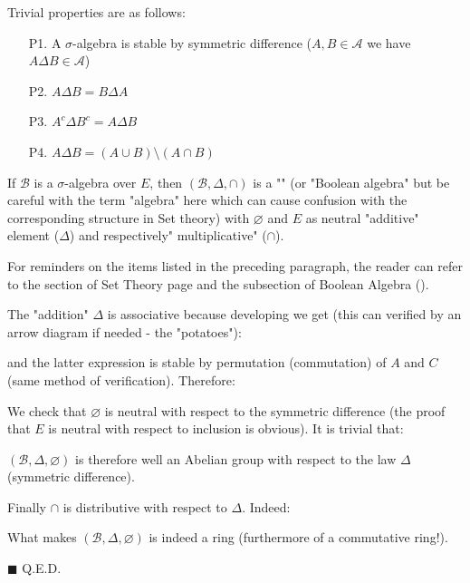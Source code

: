 	Trivial properties are as follows:
	\begin{enumerate}
		\item[P1.] A $\sigma$-algebra is stable by symmetric difference ($A,B\in \mathcal{A}$ we have $A\Delta B\in \mathcal{A}$)
		
		\item[P2.] $A\Delta B=B\Delta A$
		\item[P3.] $A^c\Delta B^c=A\Delta B$
			
		\item[P4.] $A\Delta B=(A\cup B)\setminus (A\cap B)$
	\end{enumerate}
	\begin{theorem}
	If $\mathcal{B}$ is a $\sigma$-algebra over $E$, then $(\mathcal{B},\Delta,\cap)$ is a "" (or "Boolean algebra" but be careful with the term "algebra" here which can cause confusion with the corresponding structure in Set theory) with $\varnothing$ and $E$ as neutral "additive" element ($\Delta$) and respectively" multiplicative" ($\cap$).
	\end{theorem}
	\begin{tcolorbox}[title=Remark,arc=10pt,breakable,drop lifted shadow,
  skin=enhanced,
  skin first is subskin of={enhancedfirst}{arc=10pt,no shadow},
  skin middle is subskin of={enhancedmiddle}{arc=10pt,no shadow},
  skin last is subskin of={enhancedlast}{drop lifted shadow}]
	For reminders on the items listed in the preceding paragraph, the reader can refer to the section of Set Theory page \pageref{set theory} and the subsection of Boolean Algebra ().
	\end{tcolorbox}	
	\begin{dem}
	The "addition" $\Delta$ is associative because developing we get (this can verified by an arrow diagram if needed - the "potatoes"):
	
	and the latter expression is stable by permutation (commutation) of $A$ and $C$ (same method of verification). Therefore:
	
	We check that $\varnothing$ is neutral with respect to the symmetric difference (the proof that $E$ is neutral with respect to inclusion is obvious). It is trivial that:
	
	$(\mathcal{B},\Delta,\varnothing)$ is therefore well an Abelian group with respect to the law $\Delta$ (symmetric difference).
	
	Finally $\cap$ is distributive with respect to $\Delta$. Indeed:
	
	What makes $(\mathcal{B},\Delta,\varnothing)$ is indeed a ring (furthermore of a commutative ring!).
	\begin{flushright}
		$\blacksquare$  Q.E.D.
	\end{flushright}
	\end{dem}

